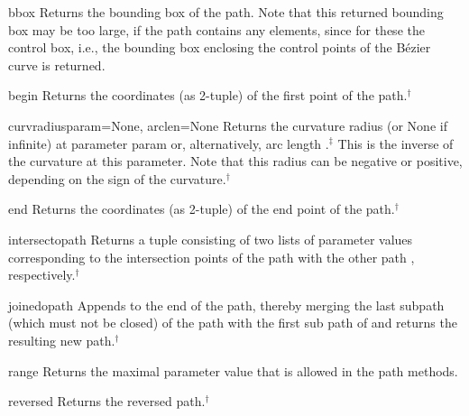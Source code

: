 \begin{methoddesc}{bbox}{}
  Returns the bounding box of the path. Note that this returned
  bounding box may be too large, if the path contains any
   elements, since for these the control box, i.e., the
  bounding box enclosing the control points of the B\'ezier curve is
  returned.
\end{methoddesc}

\begin{methoddesc}{begin}{}
  Returns the coordinates (as 2-tuple) of the first point of the path.$^\dagger$
\end{methoddesc}

\begin{methoddesc}{curvradius}{param=None, arclen=None}
  Returns the curvature radius (or None if infinite) at parameter
  param or, alternatively, arc length .$^\ddagger$ This is
  the inverse of the curvature at this parameter. Note that this
  radius can be negative or positive, depending on the sign of the
  curvature.$^\dagger$
\end{methoddesc}

\begin{methoddesc}{end}{}
  Returns the coordinates (as 2-tuple) of the end point of the path.$^\dagger$
\end{methoddesc}

\begin{methoddesc}{intersect}{opath}
  Returns a tuple consisting of two lists of parameter values
  corresponding to the intersection points of the path with the other
  path , respectively.$^\dagger$
\end{methoddesc}

\begin{methoddesc}{joined}{opath}
  Appends  to the end of the path, thereby merging the last
  subpath (which must not be closed) of the path with the first sub
  path of  and returns the resulting new path.$^\dagger$
\end{methoddesc}

\begin{methoddesc}{range}{}
  Returns the maximal parameter value  that is allowed in the
  path methods.
\end{methoddesc}

\begin{methoddesc}{reversed}{}
  Returns the reversed path.$^\dagger$
\end{methoddesc}

